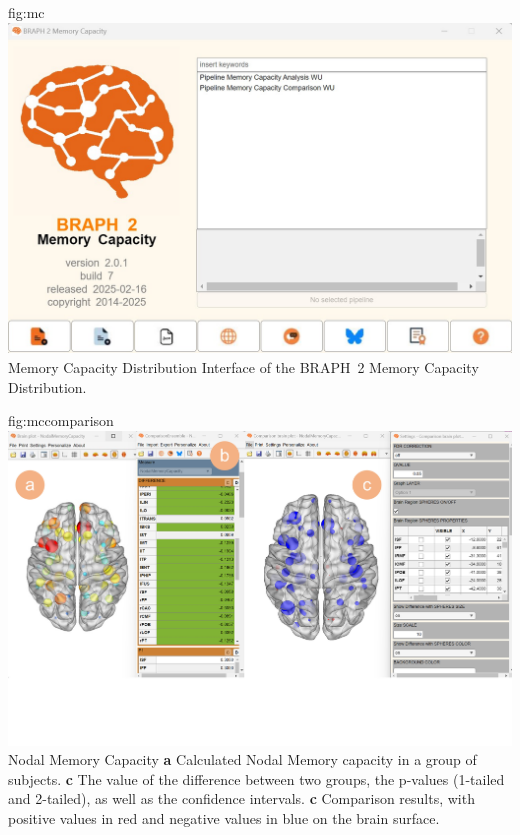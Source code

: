 \documentclass{tufte-handout}
\begin{document}
	{fig:mc}
	{\includegraphics{fig04.jpg}}
	{Memory Capacity Distribution}
	{
	Interface of the BRAPH~2 Memory Capacity Distribution.
	}


	{fig:mccomparison}
	{\includegraphics{fig05.jpg}}
	{Nodal Memory Capacity}
	{
	{\bf a} Calculated Nodal Memory capacity in a group of subjects.
	{\bf c} The value of the difference between two groups, the p-values (1-tailed and 2-tailed), as well as the confidence intervals. 
	{\bf c} Comparison results, with positive values in red and negative values in blue on the brain surface.
	}

\end{document}
